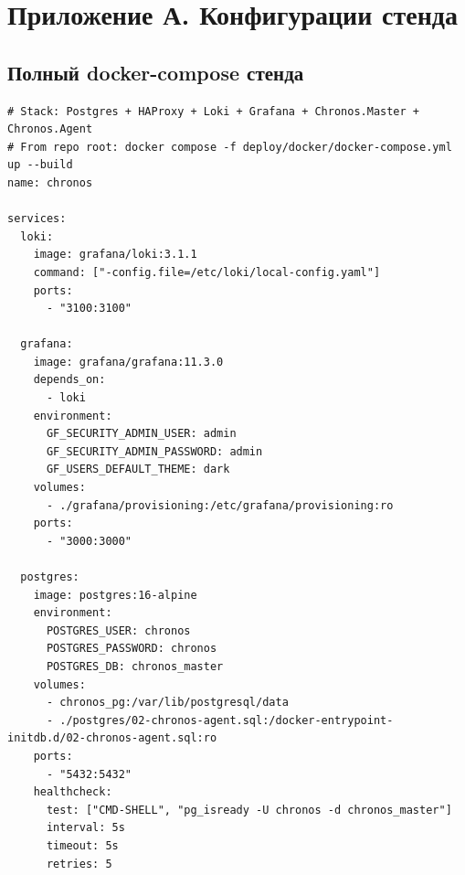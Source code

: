 \section{Приложение А. Конфигурации стенда}

\subsection{Полный docker-compose стенда}

\begin{lstlisting}[style=code,language={},caption={deploy/docker/docker-compose.yml}]
# Stack: Postgres + HAProxy + Loki + Grafana + Chronos.Master + Chronos.Agent
# From repo root: docker compose -f deploy/docker/docker-compose.yml up --build
name: chronos

services:
  loki:
    image: grafana/loki:3.1.1
    command: ["-config.file=/etc/loki/local-config.yaml"]
    ports:
      - "3100:3100"

  grafana:
    image: grafana/grafana:11.3.0
    depends_on:
      - loki
    environment:
      GF_SECURITY_ADMIN_USER: admin
      GF_SECURITY_ADMIN_PASSWORD: admin
      GF_USERS_DEFAULT_THEME: dark
    volumes:
      - ./grafana/provisioning:/etc/grafana/provisioning:ro
    ports:
      - "3000:3000"

  postgres:
    image: postgres:16-alpine
    environment:
      POSTGRES_USER: chronos
      POSTGRES_PASSWORD: chronos
      POSTGRES_DB: chronos_master
    volumes:
      - chronos_pg:/var/lib/postgresql/data
      - ./postgres/02-chronos-agent.sql:/docker-entrypoint-initdb.d/02-chronos-agent.sql:ro
    ports:
      - "5432:5432"
    healthcheck:
      test: ["CMD-SHELL", "pg_isready -U chronos -d chronos_master"]
      interval: 5s
      timeout: 5s
      retries: 5


\end{lstlisting}
